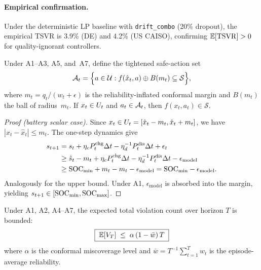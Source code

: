 \paragraph{Empirical confirmation.}
Under the deterministic LP baseline with \texttt{drift\_combo} (20\% dropout),
the empirical TSVR is 3.9\% (DE) and 4.2\% (US CAISO), confirming
$\mathbb{E}[\mathrm{TSVR}] > 0$ for quality-ignorant controllers.

\begin{theorem}\label{thm:T2}
Under A1--A3, A5, and~A7, define the tightened safe-action set
\begin{equation}\label{eq:tightened_set}
  \mathcal{A}_t = \Bigl\{ a \in \mathcal{U} :
    f(\hat{x}_t, a) \oplus B(m_t) \subseteq \mathcal{S} \Bigr\},
\end{equation}
where $m_t = q_t / (w_t + \epsilon)$ is the reliability-inflated conformal margin
and $B(m_t)$ the ball of radius~$m_t$.  If $x_t \in U_t$ and
$a_t \in \mathcal{A}_t$, then $f(x_t, a_t) \in \mathcal{S}$.
\end{theorem}

\begin{proof}[Proof (battery scalar case)]
Since $x_t \in U_t = [\hat{x}_t - m_t, \hat{x}_t + m_t]$, we have
$|x_t - \hat{x}_t| \le m_t$.  The one-step dynamics give
\begin{align}
  s_{t+1} &= s_t + \eta_c P_t^{\mathrm{chg}}\Delta t - \eta_d^{-1}P_t^{\mathrm{dis}}\Delta t + \epsilon_t \notag\\
  &\ge \hat{s}_t - m_t + \eta_c P_t^{\mathrm{chg}}\Delta t
      - \eta_d^{-1}P_t^{\mathrm{dis}}\Delta t
      - \epsilon_{\mathrm{model}} \notag\\
  &\ge \mathrm{SOC}_{\min} + m_t - m_t - \epsilon_{\mathrm{model}} = \mathrm{SOC}_{\min} - \epsilon_{\mathrm{model}}.
\end{align}
Analogously for the upper bound.  Under A1, $\epsilon_{\mathrm{model}}$ is absorbed
into the margin, yielding $s_{t+1} \in [\mathrm{SOC}_{\min}, \mathrm{SOC}_{\max}]$.
\end{proof}

\begin{corollary}\label{thm:T3}
Under A1, A2, A4--A7, the expected total violation count over horizon $T$ is bounded:
\begin{equation}\label{eq:core_bound}
  \boxed{\;\mathbb{E}[V_T] \;\le\; \alpha\,(1 - \bar{w})\,T\;}
\end{equation}
where $\alpha$ is the conformal miscoverage level and
$\bar{w} = T^{-1}\sum_{t=1}^{T} w_t$ is the episode-average reliability.
\end{corollary}

